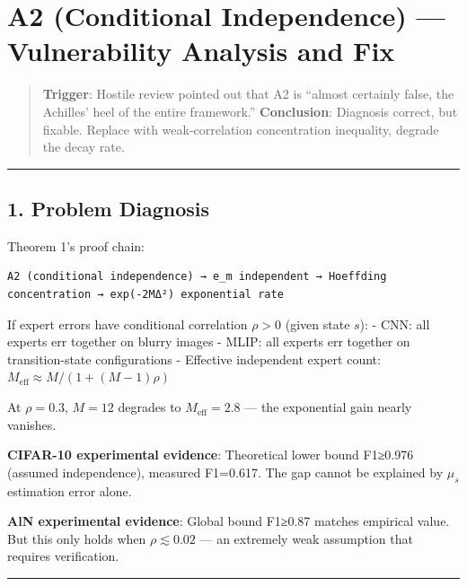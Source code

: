 \documentclass[
  12pt,
]{article}
\author{SCX}
\date{2026}
\begin{document}
\section{A2 (Conditional Independence) --- Vulnerability Analysis and Fix}\label{a2-conditional-independence-vulnerability-analysis-and-fix}

\begin{quote}
\textbf{Trigger}: Hostile review pointed out that A2 is ``almost certainly false, the Achilles' heel of the entire framework.'' \textbf{Conclusion}: Diagnosis correct, but fixable. Replace with weak-correlation concentration inequality, degrade the decay rate.
\end{quote}

\begin{center}\rule{0.5\linewidth}{0.5pt}\end{center}

\subsection{1. Problem Diagnosis}\label{problem-diagnosis}

Theorem 1's proof chain:

\begin{verbatim}
A2 (conditional independence) → e_m independent → Hoeffding concentration → exp(-2MΔ²) exponential rate
\end{verbatim}

If expert errors have conditional correlation \(\rho > 0\) (given state \(s\)): - CNN: all experts err together on blurry images - MLIP: all experts err together on transition-state configurations - Effective independent expert count: \(M_{\text{eff}} \approx M / (1 + (M-1)\rho)\)

At \(\rho = 0.3\), \(M=12\) degrades to \(M_{\text{eff}} = 2.8\) --- the exponential gain nearly vanishes.

\textbf{CIFAR-10 experimental evidence}: Theoretical lower bound F1≥0.976 (assumed independence), measured F1=0.617. The gap cannot be explained by \(\mu_s\) estimation error alone.

\textbf{AlN experimental evidence}: Global bound F1≥0.87 matches empirical value. But this only holds when \(\rho \lesssim 0.02\) --- an extremely weak assumption that requires verification.

\begin{center}\rule{0.5\linewidth}{0.5pt}\end{center}
\end{document}
